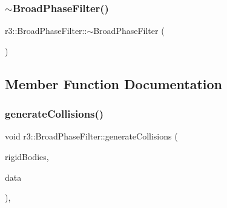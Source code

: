 \mbox{\label{classr3_1_1_broad_phase_filter_a3c28ac36ed06766b235efad77ff9fd5d}} 
\subsubsection{\texorpdfstring{$\sim$\+Broad\+Phase\+Filter()}{~BroadPhaseFilter()}}
{\footnotesize\ttfamily r3\+::\+Broad\+Phase\+Filter\+::$\sim$\+Broad\+Phase\+Filter (\begin{DoxyParamCaption}{ }\end{DoxyParamCaption})\hspace{0.3cm}{\ttfamily [default]}}



\subsection{Member Function Documentation}
\mbox{\label{classr3_1_1_broad_phase_filter_a0435dc6468401e32bf151f84f52e80f8}} 
\subsubsection{\texorpdfstring{generate\+Collisions()}{generateCollisions()}}
{\footnotesize\ttfamily void r3\+::\+Broad\+Phase\+Filter\+::generate\+Collisions (\begin{DoxyParamCaption}\item[{const std\+::vector$<$ \mbox{\hyperlink{classr3_1_1_rigid_body}{Rigid\+Body}} $\ast$$>$ \&}]{rigid\+Bodies,  }\item[{\mbox{\hyperlink{classr3_1_1_fixed_size_container}{Fixed\+Size\+Container}}$<$ \mbox{\hyperlink{classr3_1_1_collision_pair}{Collision\+Pair}} $>$ \&}]{data }\end{DoxyParamCaption})\hspace{0.3cm}{\ttfamily [override]}, {\ttfamily [virtual]}}



